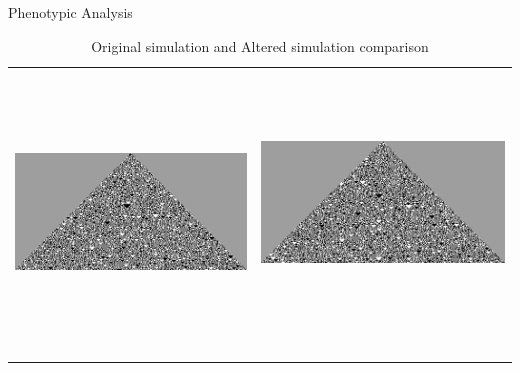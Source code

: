 \documentclass[12pt, letterpaper]{article}
\begin{document}
\begin{section}{Phenotypic Analysis}
\begin{table}[H]
\begin{tabular}{cc}
			\includegraphics[width=70mm, max height=70mm, keepaspectratio]{SimOriginal.png} & \includegraphics[width=70mm, max height=70mm, keepaspectratio]{SimAlter.png} \ 
		\end{tabular} 
		\caption{Original simulation and Altered simulation comparison} 
	\end{table} 
	\begin{figure}[H] 
		\centering 

\end{figure}
\end{section}
\end{document}
